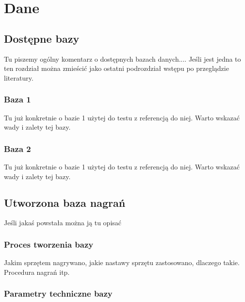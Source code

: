\section{Dane}
\label{sec:dane}


\subsection{Dostępne bazy}

Tu piszemy ogólny komentarz o dostępnych bazach danych.... Jeśli jest jedna to ten rozdział można zmieścić jako ostatni podrozdział wstępu po przeglądzie literatury.

\subsubsection{Baza 1}

Tu już konkretnie o bazie 1 użytej do testu z referencją do niej. Warto wskazać wady i zalety tej bazy.

\subsubsection{Baza 2}

Tu już konkretnie o bazie 1 użytej do testu z referencją do niej. Warto wskazać wady i zalety tej bazy.


\subsection{Utworzona baza nagrań}

Jeśli jakaś powstała można ją tu opisać

\subsubsection*{Proces tworzenia bazy}

Jakim sprzętem nagrywano, jakie nastawy sprzętu zastosowano, dlaczego takie. Procedura nagrań itp. 

\subsubsection*{Parametry techniczne bazy}

